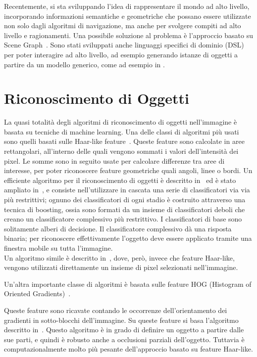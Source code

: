 Recentemente, si sta sviluppando l'idea di rappresentare il mondo ad alto livello, incorporando informazioni semantiche e geometriche che possano essere utilizzate non solo dagli algoritmi di navigazione, ma anche per svolgere compiti ad alto livello e ragionamenti. Una possibile soluzione al problema è l'approccio basato su Scene Graph~\cite{6630614}. Sono stati sviluppati anche linguaggi specifici di dominio (DSL) per poter interagire ad alto livello, ad esempio generando istanze di oggetti a partire da un modello generico, come ad esempio in \cite{blumenthal2014towards}.

\section{Riconoscimento di Oggetti}

La quasi totalità degli algoritmi di riconoscimento di oggetti nell'immagine è basata su tecniche di machine learning.
Una delle classi di algoritmi più usati sono quelli basati sulle Haar-like feature~\cite{710772}.
Queste feature sono calcolate in aree rettangolari, all'interno delle quali vengono sommati i valori dell'intensità dei pixel. Le somme sono in seguito usate per calcolare differenze tra aree di interesse, per poter riconoscere feature geometriche quali angoli, linee o bordi.
Un efficiente algoritmo per il riconoscimento di oggetti è descritto in~\cite{Viola01rapidobject} ed è stato ampliato in~\cite{Lienhart02anextended}, e consiste nell'utilizzare in cascata una serie di classificatori via via più restrittivi; ognuno dei classificatori di ogni stadio è costruito attraverso una tecnica di boosting, ossia sono formati da un insieme di classificatori deboli che creano un classificatore complessivo più restrittivo. I classificatori di base sono solitamente alberi di decisione. Il classificatore complessivo dà una risposta binaria; per riconoscere effettivamente l'oggetto deve essere applicato tramite una finestra mobile su tutta l'immagine. \\
Un algoritmo simile è descritto in~\cite{journals/ijista/AbramsonSG07}, dove, però, invece che feature Haar-like, vengono utilizzati direttamente un insieme di pixel selezionati nell'immagine.

Un'altra importante classe di algoritmi è basata sulle feature HOG (Histogram of Oriented Gradients)~\cite{1467360}.

Queste feature sono ricavate contando le occorrenze dell'orientamento dei gradienti in sotto-blocchi dell'immagine.
Su queste feature si basa l'algoritmo descritto in~\cite{lsvm-pami}. Questo algoritmo è in grado di definire un oggetto a partire dalle sue parti, e quindi è robusto anche a occlusioni parziali dell'oggetto. Tuttavia è computazionalmente molto più pesante dell'approccio basato su feature Haar-like.

